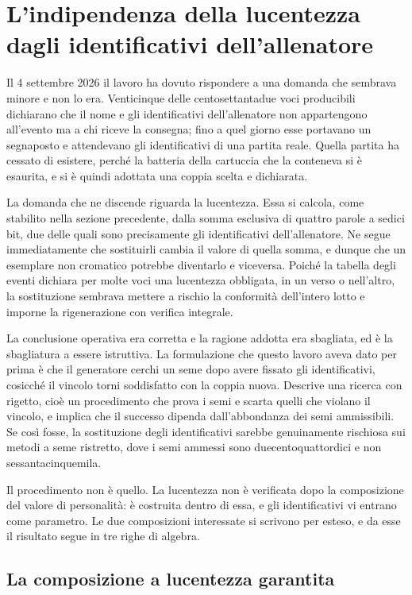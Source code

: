 \section{L'indipendenza della lucentezza dagli identificativi dell'allenatore}
\label{sec:invarianza-lucentezza}

Il 4 settembre 2026 il lavoro ha dovuto rispondere a una domanda che sembrava minore e non lo era. Venticinque delle centosettantadue voci producibili dichiarano che il nome e gli identificativi dell'allenatore non appartengono all'evento ma a chi riceve la consegna; fino a quel giorno esse portavano un segnaposto e attendevano gli identificativi di una partita reale. Quella partita ha cessato di esistere, perché la batteria della cartuccia che la conteneva si è esaurita, e si è quindi adottata una coppia scelta e dichiarata.

La domanda che ne discende riguarda la lucentezza. Essa si calcola, come stabilito nella sezione precedente, dalla somma esclusiva di quattro parole a sedici bit, due delle quali sono precisamente gli identificativi dell'allenatore. Ne segue immediatamente che sostituirli cambia il valore di quella somma, e dunque che un esemplare non cromatico potrebbe diventarlo e viceversa. Poiché la tabella degli eventi dichiara per molte voci una lucentezza obbligata, in un verso o nell'altro, la sostituzione sembrava mettere a rischio la conformità dell'intero lotto e imporne la rigenerazione con verifica integrale.

La conclusione operativa era corretta e la ragione addotta era sbagliata, ed è la sbagliatura a essere istruttiva. La formulazione che questo lavoro aveva dato per prima è che il generatore cerchi un seme dopo avere fissato gli identificativi, cosicché il vincolo torni soddisfatto con la coppia nuova. Descrive una ricerca con rigetto, cioè un procedimento che prova i semi e scarta quelli che violano il vincolo, e implica che il successo dipenda dall'abbondanza dei semi ammissibili. Se così fosse, la sostituzione degli identificativi sarebbe genuinamente rischiosa sui metodi a seme ristretto, dove i semi ammessi sono duecentoquattordici e non sessantacinquemila.

Il procedimento non è quello. La lucentezza non è verificata dopo la composizione del valore di personalità: è costruita dentro di essa, e gli identificativi vi entrano come parametro. Le due composizioni interessate si scrivono per esteso, e da esse il risultato segue in tre righe di algebra.

\subsection{La composizione a lucentezza garantita}

